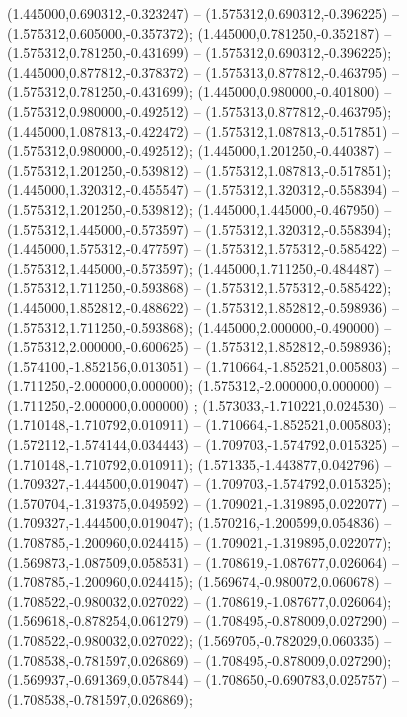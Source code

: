  (1.445000,0.690312,-0.323247) -- (1.575312,0.690312,-0.396225) -- (1.575312,0.605000,-0.357372);
 (1.445000,0.781250,-0.352187) -- (1.575312,0.781250,-0.431699) -- (1.575312,0.690312,-0.396225);
 (1.445000,0.877812,-0.378372) -- (1.575313,0.877812,-0.463795) -- (1.575312,0.781250,-0.431699);
 (1.445000,0.980000,-0.401800) -- (1.575312,0.980000,-0.492512) -- (1.575313,0.877812,-0.463795);
 (1.445000,1.087813,-0.422472) -- (1.575312,1.087813,-0.517851) -- (1.575312,0.980000,-0.492512);
 (1.445000,1.201250,-0.440387) -- (1.575312,1.201250,-0.539812) -- (1.575312,1.087813,-0.517851);
 (1.445000,1.320312,-0.455547) -- (1.575312,1.320312,-0.558394) -- (1.575312,1.201250,-0.539812);
 (1.445000,1.445000,-0.467950) -- (1.575312,1.445000,-0.573597) -- (1.575312,1.320312,-0.558394);
 (1.445000,1.575312,-0.477597) -- (1.575312,1.575312,-0.585422) -- (1.575312,1.445000,-0.573597);
 (1.445000,1.711250,-0.484487) -- (1.575312,1.711250,-0.593868) -- (1.575312,1.575312,-0.585422);
 (1.445000,1.852812,-0.488622) -- (1.575312,1.852812,-0.598936) -- (1.575312,1.711250,-0.593868);
 (1.445000,2.000000,-0.490000) -- (1.575312,2.000000,-0.600625) -- (1.575312,1.852812,-0.598936);
 (1.574100,-1.852156,0.013051) -- (1.710664,-1.852521,0.005803) -- (1.711250,-2.000000,0.000000);
 (1.575312,-2.000000,0.000000) -- (1.711250,-2.000000,0.000000) ;
 (1.573033,-1.710221,0.024530) -- (1.710148,-1.710792,0.010911) -- (1.710664,-1.852521,0.005803);
 (1.572112,-1.574144,0.034443) -- (1.709703,-1.574792,0.015325) -- (1.710148,-1.710792,0.010911);
 (1.571335,-1.443877,0.042796) -- (1.709327,-1.444500,0.019047) -- (1.709703,-1.574792,0.015325);
 (1.570704,-1.319375,0.049592) -- (1.709021,-1.319895,0.022077) -- (1.709327,-1.444500,0.019047);
 (1.570216,-1.200599,0.054836) -- (1.708785,-1.200960,0.024415) -- (1.709021,-1.319895,0.022077);
 (1.569873,-1.087509,0.058531) -- (1.708619,-1.087677,0.026064) -- (1.708785,-1.200960,0.024415);
 (1.569674,-0.980072,0.060678) -- (1.708522,-0.980032,0.027022) -- (1.708619,-1.087677,0.026064);
 (1.569618,-0.878254,0.061279) -- (1.708495,-0.878009,0.027290) -- (1.708522,-0.980032,0.027022);
 (1.569705,-0.782029,0.060335) -- (1.708538,-0.781597,0.026869) -- (1.708495,-0.878009,0.027290);
 (1.569937,-0.691369,0.057844) -- (1.708650,-0.690783,0.025757) -- (1.708538,-0.781597,0.026869);
